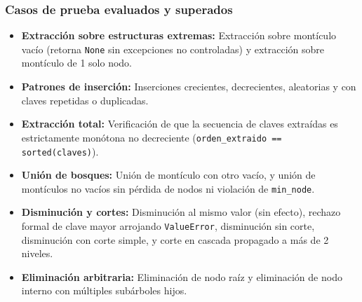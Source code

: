 \subsubsection*{Casos de prueba evaluados y superados}
\begin{itemize}
    \item \textbf{Extracción sobre estructuras extremas:} Extracción sobre montículo vacío (retorna \texttt{None} sin excepciones no controladas) y extracción sobre montículo de 1 solo nodo.
    \item \textbf{Patrones de inserción:} Inserciones crecientes, decrecientes, aleatorias y con claves repetidas o duplicadas.
    \item \textbf{Extracción total:} Verificación de que la secuencia de claves extraídas es estrictamente monótona no decreciente (\texttt{orden\_extraido == sorted(claves)}).
    \item \textbf{Unión de bosques:} Unión de montículo con otro vacío, y unión de montículos no vacíos sin pérdida de nodos ni violación de \texttt{min\_node}.
    \item \textbf{Disminución y cortes:} Disminución al mismo valor (sin efecto), rechazo formal de clave mayor arrojando \texttt{ValueError}, disminución sin corte, disminución con corte simple, y corte en cascada propagado a más de 2 niveles.
    \item \textbf{Eliminación arbitraria:} Eliminación de nodo raíz y eliminación de nodo interno con múltiples subárboles hijos.
\end{itemize}
